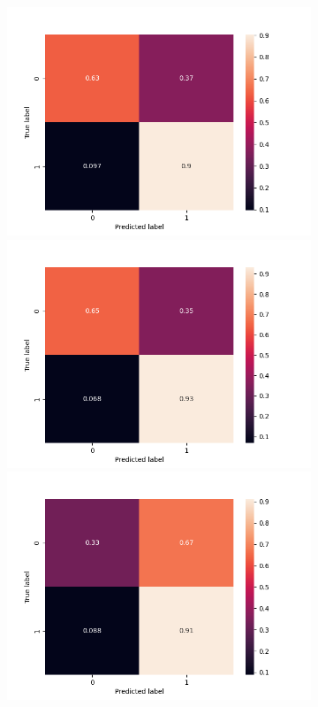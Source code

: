 \begin{figure}
\begin{subfigure}[b]{\textwidth}
      \includegraphics[width=\linewidth]{figures/results/word_embeddings/lgr/take_image/lgr_set_4_confusion_matrix_percent.png}
    \endminipage\hfill
      \includegraphics[width=\linewidth]{figures/results/word_embeddings/lgr/take_image/lgr_set_5_confusion_matrix_percent.png}
    \endminipage\hfill
      \includegraphics[width=\linewidth]{figures/results/word_embeddings/lgr/take_image/lgr_set_6_confusion_matrix_percent.png}

\end{subfigure}
\end{figure}
